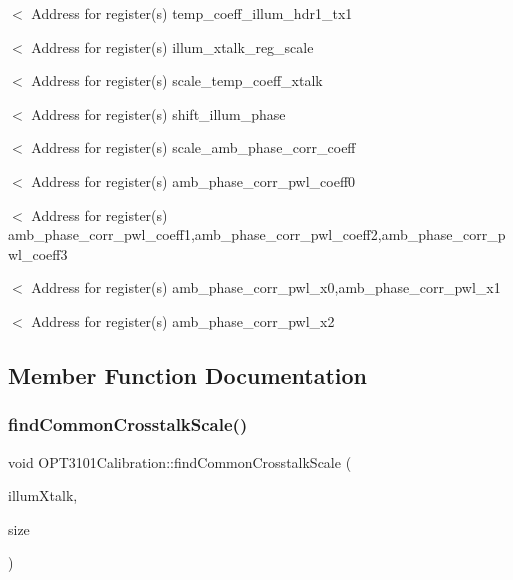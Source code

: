$<$ Address for register(s) temp\+\_\+coeff\+\_\+illum\+\_\+hdr1\+\_\+tx1

$<$ Address for register(s) illum\+\_\+xtalk\+\_\+reg\+\_\+scale

$<$ Address for register(s) scale\+\_\+temp\+\_\+coeff\+\_\+xtalk

$<$ Address for register(s) shift\+\_\+illum\+\_\+phase

$<$ Address for register(s) scale\+\_\+amb\+\_\+phase\+\_\+corr\+\_\+coeff

$<$ Address for register(s) amb\+\_\+phase\+\_\+corr\+\_\+pwl\+\_\+coeff0

$<$ Address for register(s) amb\+\_\+phase\+\_\+corr\+\_\+pwl\+\_\+coeff1,amb\+\_\+phase\+\_\+corr\+\_\+pwl\+\_\+coeff2,amb\+\_\+phase\+\_\+corr\+\_\+pwl\+\_\+coeff3

$<$ Address for register(s) amb\+\_\+phase\+\_\+corr\+\_\+pwl\+\_\+x0,amb\+\_\+phase\+\_\+corr\+\_\+pwl\+\_\+x1

$<$ Address for register(s) amb\+\_\+phase\+\_\+corr\+\_\+pwl\+\_\+x2 

\subsection{Member Function Documentation}
\mbox{\label{class_o_p_t3101_calibration_a22326c58bcd12e66b54c267b630916c9}} 
\subsubsection{\texorpdfstring{find\+Common\+Crosstalk\+Scale()}{findCommonCrosstalkScale()}}
{\footnotesize\ttfamily void O\+P\+T3101\+Calibration\+::find\+Common\+Crosstalk\+Scale (\begin{DoxyParamCaption}\item[{\mbox{\hyperlink{class_o_p_t3101_1_1crosstalk_c}{O\+P\+T3101\+::crosstalkC}} $\ast$}]{illum\+Xtalk,  }\item[{uint8\+\_\+t}]{size }\end{DoxyParamCaption})}

\mbox{\label{class_o_p_t3101_calibration_a3793ff10d62c79f6160070ddabf9601a}} 
